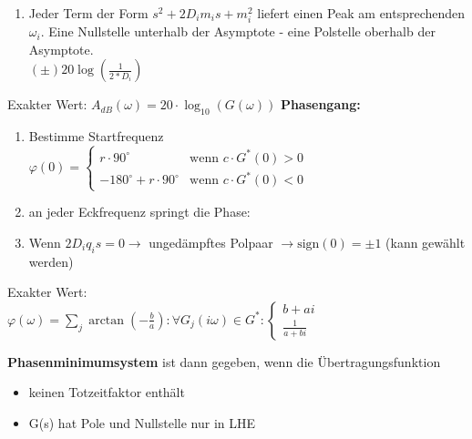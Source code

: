 \begin{tcolorbox}[colback=white!10!white,
                  colframe=blue!50!white,
                  title=Konstruktionsregeln Bode-Diagramm]
\begin{enumerate}
\begin{description}[leftmargin=14em,style=nextline]
            \end{description}
        \item Jeder Term der Form $s^2 + 2D_im_is+m_i^2$ liefert einen Peak  am entsprechenden $\omega_i$. Eine Nullstelle unterhalb der Asymptote - eine Polstelle oberhalb der Asymptote.\\
        $(\pm)20\log(\frac{1}{2*D_i})$
    \end{enumerate}
    Exakter Wert: $A_{dB}(\omega) = 20 \cdot \log_{10} \left(G(\omega)\right)$
    \tcblower
    \textbf{Phasengang:}
    \begin{enumerate}
        \item Bestimme Startfrequenz\\
        $\varphi(0) = \begin{cases}
    r\cdot 90^\circ &\mbox{wenn } c\cdot G^*(0)>0\\
    -180^\circ+r\cdot 90^\circ & \mbox{wenn } c\cdot G^*(0)<0
        \end{cases} $
        \item an jeder Eckfrequenz springt die Phase:
        \item Wenn $2D_iq_is = 0 \rightarrow$ ungedämpftes Polpaar $\rightarrow\mbox{sign}(0) = \pm 1$ (kann gewählt werden)
    \end{enumerate}
    Exakter Wert: \\
        $\varphi(\omega) = \sum\limits_{j} \arctan\left(-\frac{b}{a}\right)
        : \forall G_j(i\omega) \in G^* : \begin{cases}
            b + ai \\
            \frac{1}{a + bi}
        \end{cases}$
\end{tcolorbox}

\begin{tcolorbox}[colback=white!10!white,colframe=green!30!black,title=Phasenminimumsystem]
\textbf{Phasenminimumsystem} ist dann gegeben, wenn die Übertragungsfunktion
\begin{itemize}
    \item keinen Totzeitfaktor enthält
    \item G(s) hat Pole und Nullstelle nur in LHE
\end{itemize}
\end{tcolorbox}
